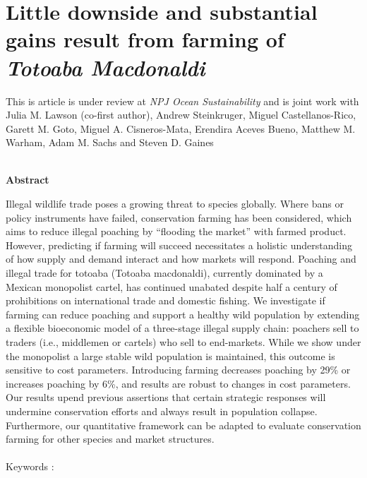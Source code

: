 \chapter{Little downside and substantial gains result from farming of \textit{Totoaba Macdonaldi}}

\begin{center}
\begin{minipage}{0.9\textwidth}
\singlespacing
This is article is under review at \textit{NPJ Ocean Sustainability} and is joint work with Julia M. Lawson (co-first author), Andrew Steinkruger, Miguel Castellanos-Rico, Garett M. Goto, Miguel A. Cisneros-Mata, Erendira Aceves Bueno, Matthew M. Warham, Adam M. Sachs and Steven D. Gaines\\\\
\end{minipage}

\textbf{Abstract}\par
    \vspace*{.2cm}
    \noindent
    \begin{minipage}{0.9\textwidth}
Illegal wildlife trade poses a growing threat to species globally. Where bans or policy instruments have failed, conservation farming has been considered, which aims to reduce illegal poaching by “flooding the market” with farmed product. However, predicting if farming will succeed necessitates a holistic understanding of how supply and demand interact and how markets will respond. Poaching and illegal trade for totoaba (Totoaba macdonaldi), currently dominated by a Mexican monopolist cartel, has continued unabated despite half a century of prohibitions on international trade and domestic fishing. We investigate if farming can reduce poaching and support a healthy wild population by extending a flexible bioeconomic model of a three-stage illegal supply chain: poachers sell to traders (i.e., middlemen or cartels) who sell to end-markets. While we show under the monopolist a large stable wild population is maintained, this outcome is sensitive to cost parameters. Introducing farming decreases poaching by 29\% or increases poaching by 6\%, and results are robust to changes in cost parameters. Our results upend previous assertions that certain strategic responses will undermine conservation efforts and always result in population collapse. Furthermore, our quantitative framework can be adapted to evaluate conservation farming for other species and market structures.\\\\
Keywords : 
\end{minipage}
\end{center}
    \vfill


